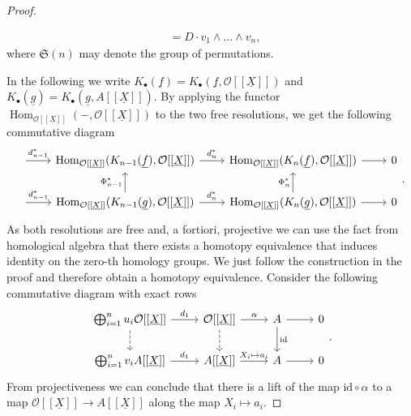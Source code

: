 \documentclass{article}
\theoremstyle{plain}%
\theoremstyle{definition}
\theoremstyle{remark}
\renewcommand{\hom}{\operatorname{Hom}}
\begin{document}
\begin{proof}
\begin{enumerate}
\begin{align*}
            &= D \cdot v_1 \wedge \dots \wedge v_n,
        \end{align*}
        where \(\mathfrak{S}(n)\) may denote the group of permutations.
    \end{enumerate}
    In the following we write 
    \(K_\bullet(\underline{f}) = K_\bullet(\underline{f}, \mathcal{O}[[\underline{X}]])\)
    and 
    \(K_\bullet(\underline{g}) = K_\bullet(\underline{g}, A[[\underline{X}]])\).
    By applying the functor \(\hom_{\mathcal{O}[[\underline{X}]]}(-, \mathcal{O}[[\underline{X}]])\)
    to the two free resolutions, we get the following commutative diagram
    \[
        \begin{tikzcd}[column sep=2.2em]
            \arrow[r, "d_{n-1}^*"] & 
            \hom_{\mathcal{O}[[\underline{X}]]}(K_{n-1}(\underline{f}), \mathcal{O}[[\underline{X}]]) 
            \arrow[r, "d_n^*"] &
            \hom_{\mathcal{O}[[\underline{X}]]}(K_n(\underline{f}), \mathcal{O}[[\underline{X}]]) 
            \arrow[r] & 0\\
            \arrow[r, "d_{n-1}^*"] & 
            \hom_{\mathcal{O}[[\underline{X}]]}(K_{n-1}(\underline{g}), \mathcal{O}[[\underline{X}]])
            \arrow[r, "d_n^*"] \arrow[u, "\Phi_{n-1}^*"] &
            \hom_{\mathcal{O}[[\underline{X}]]}(K_n(\underline{g}), \mathcal{O}[[\underline{X}]]) 
            \arrow[r] \arrow[u, "\Phi_{n}^*"] & 0
        \end{tikzcd}.
    \]
    As both resolutions are free and, a fortiori, projective we can use the fact from homological algebra
    that there exists a homotopy equivalence that induces identity on the zero-th homology groups.
    We just follow the construction in the proof and therefore obtain a homotopy equivalence.
    Consider the following commutative diagram with exact rows
    \[
            \begin{tikzcd}
                \bigoplus_{i=1}^n u_i \mathcal{O}[[\underline{X}]] \arrow[r, "d_1"] \arrow[d, dashed] 
                &\mathcal{O}[[\underline{X}]]  \arrow[r, "\alpha"] \arrow[d, dashed] & A \arrow[r] \arrow[d, "\mathrm{id}"] & 0\\
                \bigoplus_{i=1}^n v_i A[[\underline{X}]] \arrow[r, "d_1"] 
                & A[[\underline{X}]] \arrow[r, "X_i \mapsto a_i"] & A \arrow[r] & 0
            \end{tikzcd}.
        \]
    From projectiveness we can conclude that there is a lift of the map \(\mathrm{id} \circ \alpha\) to a map 
    \(\mathcal{O}[[\underline{X}]] \to A[[\underline{X}]]\) along the map \(X_i \mapsto a_i\). 

\end{proof}
\end{document}
